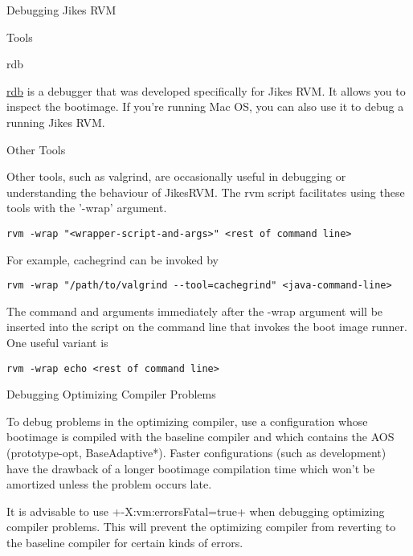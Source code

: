 \begin{chapter}{Debugging Jikes RVM}
\begin{section}{Tools}
\begin{subsection}{rdb}

\href{http://sape.inf.usi.ch/rdb}{rdb} is a debugger that was developed specifically for Jikes RVM. It allows you to inspect the bootimage. If you're running Mac OS, you can also use it to debug a running Jikes RVM.
\end{subsection}

\begin{subsection}{Other Tools}

Other tools, such as valgrind, are occasionally useful in debugging or understanding the behaviour of JikesRVM.  The rvm script facilitates using these tools with the '-wrap' argument.

\begin{lstlisting}
rvm -wrap "<wrapper-script-and-args>" <rest of command line>
\end{lstlisting}

For example, cachegrind can be invoked by

\begin{lstlisting}
rvm -wrap "/path/to/valgrind --tool=cachegrind" <java-command-line>
\end{lstlisting}

The command and arguments immediately after the -wrap argument will be inserted into the script on the command line that invokes the boot image runner.  One useful variant is

\begin{lstlisting}
rvm -wrap echo <rest of command line>
\end{lstlisting}

\end{subsection}

\end{section}

\begin{section}{Debugging Optimizing Compiler Problems}

To debug problems in the optimizing compiler, use a configuration whose bootimage is compiled with the baseline compiler and which contains the AOS (prototype-opt, BaseAdaptive*). Faster configurations (such as development) have the drawback of a longer bootimage compilation time which won't be amortized unless the problem occurs late.

It is advisable to use \spverb+-X:vm:errorsFatal=true+ when debugging optimizing compiler problems. This will prevent the optimizing compiler from reverting to the baseline compiler for certain kinds of errors.


\end{section}
\end{chapter}
